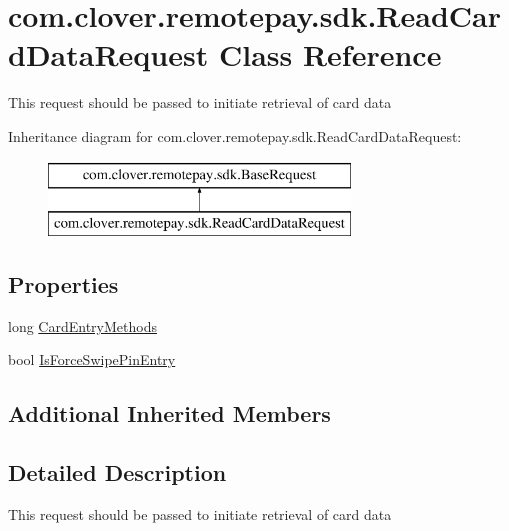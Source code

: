 \hypertarget{classcom_1_1clover_1_1remotepay_1_1sdk_1_1_read_card_data_request}{}\section{com.\+clover.\+remotepay.\+sdk.\+Read\+Card\+Data\+Request Class Reference}
\label{classcom_1_1clover_1_1remotepay_1_1sdk_1_1_read_card_data_request}


This request should be passed to initiate retrieval of card data  


Inheritance diagram for com.\+clover.\+remotepay.\+sdk.\+Read\+Card\+Data\+Request\+:\begin{figure}[H]
\begin{center}
\leavevmode
\includegraphics[height=2.000000cm]{classcom_1_1clover_1_1remotepay_1_1sdk_1_1_read_card_data_request}
\end{center}
\end{figure}
\subsection*{Properties}
\begin{DoxyCompactItemize}
\item 
long \hyperlink{classcom_1_1clover_1_1remotepay_1_1sdk_1_1_read_card_data_request_a7ca867a2e97f195f0b16c038e3364708}{Card\+Entry\+Methods}
\item 
bool \hyperlink{classcom_1_1clover_1_1remotepay_1_1sdk_1_1_read_card_data_request_aa5fa167d2609b5e1944d7a328313e9ad}{Is\+Force\+Swipe\+Pin\+Entry}
\end{DoxyCompactItemize}
\subsection*{Additional Inherited Members}


\subsection{Detailed Description}
This request should be passed to initiate retrieval of card data 



